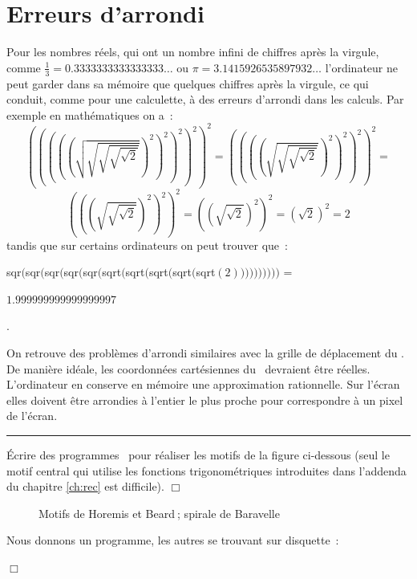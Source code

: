 \section{Erreurs d'arrondi}
Pour les nombres réels, qui ont un nombre infini de chiffres après la virgule, comme
$\frac{1}{3} = 0.3333333333333333\ldots$ ou $\pi = 3.1415926535897932\ldots$
l'ordinateur ne peut garder dans sa mémoire que quelques chiffres après la virgule, ce
qui conduit, comme pour une calculette, à des erreurs d'arrondi dans les calculs. Par
exemple en ma\-thé\-ma\-ti\-ques on a~:
\[\left(\left(\left(\left(\left(\sqrt{\sqrt{\sqrt{\sqrt{\sqrt{2}}}}}\right)^{2}\right)^{2}\right)^{2}\right)^{2}\right)^{2} = 
\left(\left(\left(\left(\sqrt{\sqrt{\sqrt{\sqrt{2}}}}\right)^{2}\right)^{2}\right)^{2}\right)^{2} =
\] \[\left(\left(\left(\sqrt{\sqrt{\sqrt{2}}}\right)^{2}\right)^{2}\right)^{2} =
\left(\left(\sqrt{\sqrt{2}}\right)^{2}\right)^{2} =
\left(\sqrt{2}\right)^{2} =
2\] 
tandis que sur
certains ordinateurs on peut trouver que~:

{\idt sqr$($sqr$($sqr$($sqr$($sqr$($sqrt$($sqrt$($sqrt$($sqrt$($sqrt$(2))))))))))$ =

$1.999999999999999997$}.

\noindent  On retrouve des problèmes d'arrondi similaires avec la grille de dé\-pla\-ce\-ment du \robot. De
manière idéale, les coordonnées cartésiennes du \robot\ devraient être réelles. 
L'ordinateur en conserve en mémoire une approximation rationnelle. Sur l'écran elles doivent
être arrondies à l'entier le plus proche pour correspondre à un pixel de l'écran.

\noindent \rule{137mm}{0.1mm} %
\begin{exercice}{Écrire des programmes \pascal\  pour réaliser les motifs de la figure
ci-dessous (seul le motif central qui utilise les fonc\-tions tri\-go\-no\-mé\-tri\-ques in\-tro\-dui\-tes
dans l'addenda du chapitre \ref{ch:rec}  est difficile).
\noindent $\Box$}\end{exercice}
\begin{figure}[htbp]
 \caption{Motifs de Horemis et Beard$\:$; spirale de Baravelle}\label{fig:beard}
\end{figure}
\vfill
\begin{corrige}{
Nous donnons un programme, les autres se trouvant sur disquette~:

\noindent $\Box$}\end{corrige}

